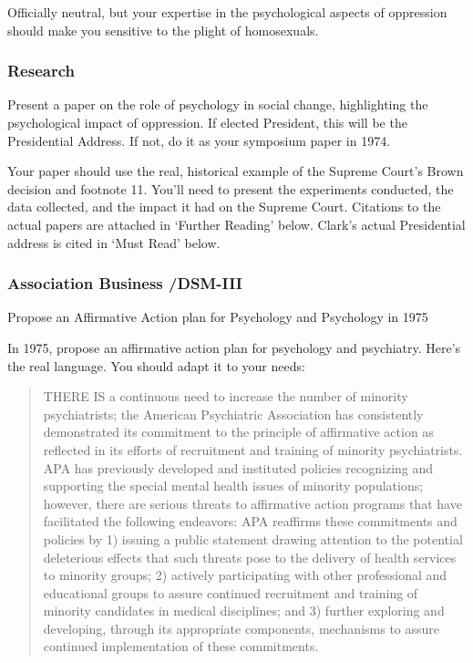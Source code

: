 \begin{refsection}
Officially neutral, but your expertise in the psychological aspects of oppression should make you sensitive to the plight of homosexuals.

\subsubsection{Research}
\label{research}

\begin{writingtask}[Clark - 1974]\label{writingtask:clark}
Present a paper on the role of psychology in social change, highlighting the psychological impact of oppression. If elected President, this will be the Presidential Address. If not, do it as your symposium paper in 1974.
\end{writingtask}

Your paper should use the real, historical example of the Supreme Court’s Brown decision and footnote 11. You’ll need to present the experiments conducted, the data collected, and the impact it had on the Supreme Court. Citations to the actual papers are attached in ‘Further Reading’ below. Clark’s actual Presidential address is cited in ‘Must Read’ below.

\subsubsection{Association Business \slash  DSM-III}
\label{associationbusinessdsm-iii}

\begin{proposal}[Clark]\label{proposal:clark}Propose an Affirmative Action plan for Psychology and Psychology in 1975\end{proposal}

In 1975, propose an affirmative action plan for psychology and psychiatry. Here's the real language. You should adapt it to your needs:

\begin{quote}

THERE IS a continuous need to increase the number of minority psychiatrists; the American Psychiatric Association has consistently demonstrated its commitment to the principle of affirmative action as reflected in its efforts of recruitment and training of minority psychiatrists. APA has previously developed and instituted policies recognizing and supporting the special mental health issues of minority populations; however, there are serious threats to affirmative action programs that have facilitated the following endeavors: APA reaffirms these commitments and policies by 1) issuing a public statement drawing attention to the potential deleterious effects that such threats pose to the delivery of health services to minority groups; 2) actively participating with other professional and educational groups to assure continued recruitment and training of minority candidates in medical disciplines; and 3) further exploring and developing, through its appropriate components, mechanisms to assure continued implementation of these commitments.
\end{quote}


\end{refsection}
